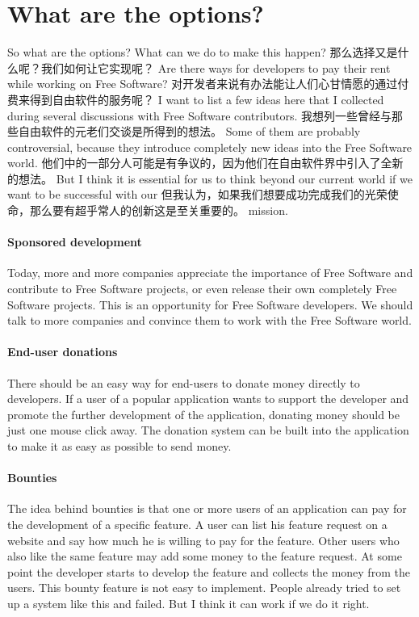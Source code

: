 \section*{What are the options?}

So what are the options? What can we do to make this happen?
那么选择又是什么呢？我们如何让它实现呢？
Are there ways for developers to pay their rent while working on Free Software? 
对开发者来说有办法能让人们心甘情愿的通过付费来得到自由软件的服务呢？
I want to list a few ideas here that I collected during several discussions with Free Software contributors.
我想列一些曾经与那些自由软件的元老们交谈是所得到的想法。
Some of them are probably controversial, because they introduce completely new ideas into the Free Software world.
他们中的一部分人可能是有争议的，因为他们在自由软件界中引入了全新的想法。
But I think it is essential for us to think beyond our current world if we want to be successful with our
但我认为，如果我们想要成功完成我们的光荣使命，那么要有超乎常人的创新这是至关重要的。
mission.  

\paragraph*{Sponsored development}

Today, more and more companies appreciate the importance of Free Software and
contribute to Free Software projects, or even release their own completely Free
Software projects. This is an opportunity for Free Software developers. We
should talk to more companies and convince them to work with the Free Software
world. 

\paragraph*{End-user donations}

There should be an easy way for end-users to donate money directly to
developers. If a user of a popular application wants to support the developer
and promote the further development of the application, donating money should be
just one mouse click away. The donation system can be built into the application
to make it as easy as possible to send money.

\paragraph*{Bounties}

The idea behind bounties is that one or more users of an application can pay for
the development of a specific feature. A user can list his feature request on a
website and say how much he is willing to pay for the feature. Other users who
also like the same feature may add some money to the feature request. At some
point the developer starts to develop the feature and collects the money from
the users. This bounty feature is not easy to implement. People already tried to
set up a system like this and failed. But I think it can work if we do it
right. 

